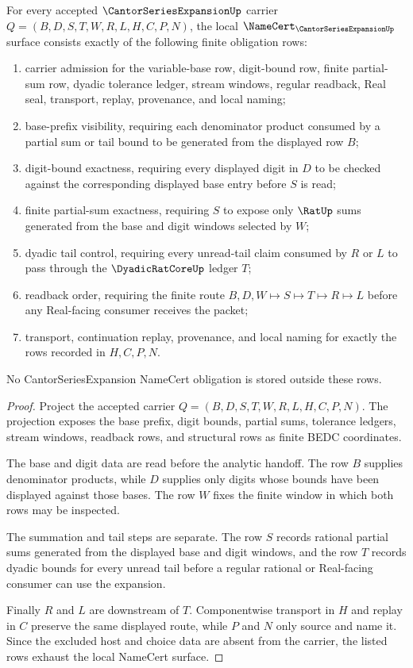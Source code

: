 \begin{theorem}
\label{thm:cantor-series-expansion-namecert-obligations}
For every accepted $\CantorSeriesExpansionUp$ carrier $Q=(B,D,S,T,W,R,L,H,C,P,N)$, the local $\NameCert_{\CantorSeriesExpansionUp}$ surface consists exactly of the following finite obligation rows:
\begin{enumerate}
\item carrier admission for the variable-base row, digit-bound row, finite partial-sum row, dyadic tolerance ledger, stream windows, regular readback, Real seal, transport, replay, provenance, and local naming;
\item base-prefix visibility, requiring each denominator product consumed by a partial sum or tail bound to be generated from the displayed row $B$;
\item digit-bound exactness, requiring every displayed digit in $D$ to be checked against the corresponding displayed base entry before $S$ is read;
\item finite partial-sum exactness, requiring $S$ to expose only $\RatUp$ sums generated from the base and digit windows selected by $W$;
\item dyadic tail control, requiring every unread-tail claim consumed by $R$ or $L$ to pass through the $\DyadicRatCoreUp$ ledger $T$;
\item readback order, requiring the finite route $B,D,W \longmapsto S \longmapsto T \longmapsto R \longmapsto L$ before any Real-facing consumer receives the packet;
\item transport, continuation replay, provenance, and local naming for exactly the rows recorded in $H,C,P,N$.
\end{enumerate}
No CantorSeriesExpansion NameCert obligation is stored outside these rows.
\end{theorem}
\begin{proof}
Project the accepted carrier $Q=(B,D,S,T,W,R,L,H,C,P,N)$. The projection exposes the base prefix, digit bounds, partial sums, tolerance ledgers, stream windows, readback rows, and structural rows as finite BEDC coordinates.

The base and digit data are read before the analytic handoff. The row $B$ supplies denominator products, while $D$ supplies only digits whose bounds have been displayed against those bases. The row $W$ fixes the finite window in which both rows may be inspected.

The summation and tail steps are separate. The row $S$ records rational partial sums generated from the displayed base and digit windows, and the row $T$ records dyadic bounds for every unread tail before a regular rational or Real-facing consumer can use the expansion.

Finally $R$ and $L$ are downstream of $T$. Componentwise transport in $H$ and replay in $C$ preserve the same displayed route, while $P$ and $N$ only source and name it. Since the excluded host and choice data are absent from the carrier, the listed rows exhaust the local NameCert surface.
\end{proof}

